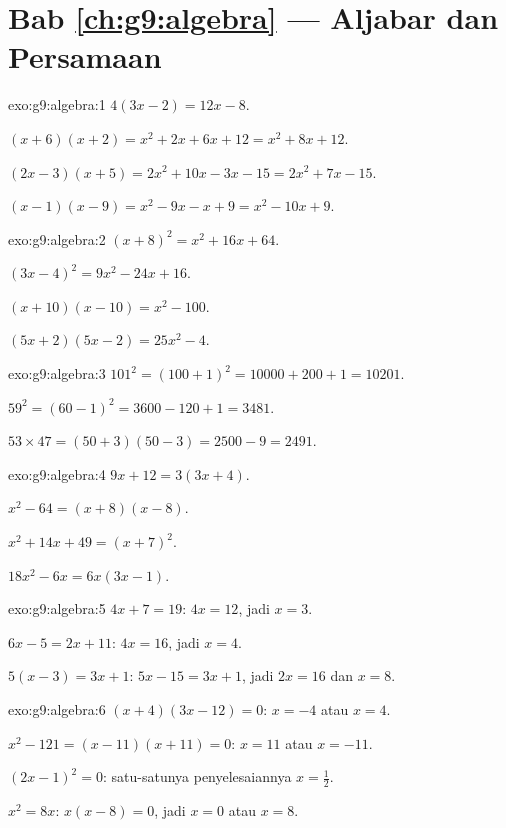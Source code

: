 \section*{Bab \ref{ch:g9:algebra} --- Aljabar dan Persamaan}

\begin{solution}{exo:g9:algebra:1}
$4(3x - 2) = 12x - 8$.

$(x+6)(x+2) = x^2 + 2x + 6x + 12 = x^2 + 8x + 12$.

$(2x-3)(x+5) = 2x^2 + 10x - 3x - 15 = 2x^2 + 7x - 15$.

$(x-1)(x-9) = x^2 - 9x - x + 9 = x^2 - 10x + 9$.
\end{solution}

\begin{solution}{exo:g9:algebra:2}
$(x+8)^2 = x^2 + 16x + 64$.

$(3x-4)^2 = 9x^2 - 24x + 16$.

$(x+10)(x-10) = x^2 - 100$.

$(5x+2)(5x-2) = 25x^2 - 4$.
\end{solution}

\begin{solution}{exo:g9:algebra:3}
$101^2 = (100+1)^2 = 10000 + 200 + 1 = 10201$.

$59^2 = (60-1)^2 = 3600 - 120 + 1 = 3481$.

$53 \times 47 = (50+3)(50-3) = 2500 - 9 = 2491$.
\end{solution}

\begin{solution}{exo:g9:algebra:4}
$9x + 12 = 3(3x + 4)$.

$x^2 - 64 = (x+8)(x-8)$.

$x^2 + 14x + 49 = (x+7)^2$.

$18x^2 - 6x = 6x(3x - 1)$.
\end{solution}

\begin{solution}{exo:g9:algebra:5}
$4x + 7 = 19$: $4x = 12$, jadi $x = 3$.

$6x - 5 = 2x + 11$: $4x = 16$, jadi $x = 4$.

$5(x-3) = 3x + 1$: $5x - 15 = 3x + 1$, jadi $2x = 16$ dan $x = 8$.
\end{solution}

\begin{solution}{exo:g9:algebra:6}
$(x+4)(3x-12) = 0$: $x = -4$ atau $x = 4$.

$x^2 - 121 = (x-11)(x+11) = 0$: $x = 11$ atau $x = -11$.

$(2x-1)^2 = 0$: satu-satunya penyelesaiannya $x = \frac12$.

$x^2 = 8x$: $x(x - 8) = 0$, jadi $x = 0$ atau $x = 8$.
\end{solution}

